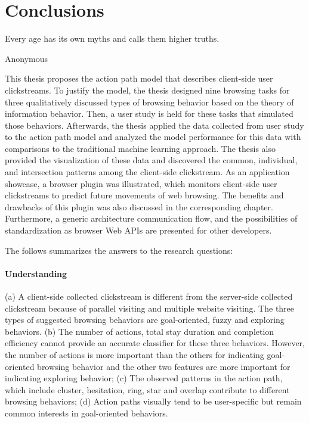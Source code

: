 \section{Conclusions}
\label{ch:final}

\epigraph{Every age has its own myths and calls them higher truths.}{Anonymous}



This thesis proposes the action path model that describes client-side user clickstreams.
To justify the model, the thesis designed nine browsing tasks for three qualitatively
discussed types of browsing behavior based on the theory of information behavior. 
Then, a user study is held for these tasks that simulated those behaviors. 
Afterwards, the thesis applied the data collected from user study to the action path model and
analyzed the model performance for this data with comparisons to the traditional machine 
learning approach.
The thesis also provided the visualization of these data and discovered the common, 
individual, and intersection patterns among the client-side clickstream.
As an application showcase, a browser plugin was illustrated, which monitors client-side 
user clickstreams to predict future movements of web browsing. The benefits and drawbacks of 
this plugin was also discussed in the corresponding chapter.
Furthermore, a generic architecture communication flow, and the possibilities of 
standardization as browser Web APIs are presented for other developers.


The follows summarizes the answers to the research questions:

\paragraph{Understanding} 
(a) A client-side collected clickstream is different from the 
server-side collected clickstream because of parallel visiting 
and multiple website visiting. The three types of suggested browsing behaviors are
goal-oriented, fuzzy and exploring behaviors.
(b) The number of actions, total stay duration and completion efficiency cannot 
provide an accurate classifier for these three behaviors. However, 
the number of actions is more important than the others for indicating 
goal-oriented browsing behavior and the other two features are more important 
for indicating exploring behavior;
(c) The observed patterns in the action path, which include cluster, hesitation, ring, 
star and overlap contribute to different browsing behaviors;
(d) Action paths visually tend to be user-specific but remain common interests 
in goal-oriented behaviors.
